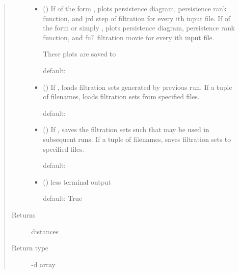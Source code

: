 \documentclass[letterpaper,10pt,openany,oneside,english]{sphinxmanual}
\begin{document}
\begin{fulllineitems}
\begin{quote}
\begin{description}
\begin{itemize}
\item {} 
 (\sphinxstyleliteralemphasis{, }) \textendash{} 
If of the form , plots persistence
diagram, persistence rank function, and jrd step of filtration for
every ith input file. If of the form  or simply
, plots persistence diagram, persistence rank function, and full
filtration movie for every ith input file.

These plots are saved to 

default: 


\item {} 
 (\sphinxstyleliteralemphasis{, }) \textendash{} 
If , loads filtration sets generated by previous run. If a
tuple of filenames, loads filtration sets from specified files.

default: 


\item {} 
 (\sphinxstyleliteralemphasis{, }) \textendash{} 
If , saves the filtration sets such that 
may     be used in subsequent runs. If a tuple of filenames, saves
filtration sets to specified files.

default: 


\item {} 
 (\sphinxstyleliteralemphasis{, }) \textendash{} 
less terminal output

default: True


\end{itemize}

\item[{Returns}] \leavevmode
distances

\item[{Return type}] -d array

\end{description}\end{quote}

\end{fulllineitems}
\end{document}
